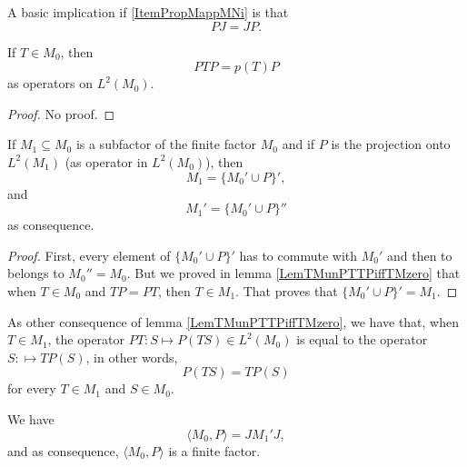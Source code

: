 A basic implication if \ref{ItemPropMappMNi} is that 
\begin{equation}
	PJ=JP.
\end{equation}


\begin{lemma}		\label{LemPTPpTPopLdeux}
If $T\in M_0$, then 
\begin{equation}
	PTP=p(T)P
\end{equation}
as operators on $L^2(M_0)$.
\end{lemma}

\begin{proof}
No proof.
\end{proof}

\begin{lemma}		\label{LemNMpPNcup}
If $M_1\subseteq M_0$ is a subfactor of the finite factor $M_0$ and if $P$ is the projection onto $L^2(M_1)$ (as operator in $L^2(M_0)$), then
\begin{equation}
	M_1=\{ M_0'\cup P \}',
\end{equation}
and
\begin{equation}
	M_1'=\{ M_0'\cup P \}''
\end{equation}
as consequence.
\end{lemma}

\begin{proof}
First, every element of $\{ M_0'\cup P \}'$ has to commute with $M_0'$ and then to belongs to $M_0''=M_0$. But we proved in lemma \ref{LemTMunPTTPiffTMzero} that when $T\in M_0$ and $TP=PT$, then $T\in M_1$. That proves that $\{ M_0'\cup P \}'=M_1$.
\end{proof}

As other consequence of lemma \ref{LemTMunPTTPiffTMzero}, we have that, when $T\in M_1$, the operator $PT\colon S\mapsto P(TS)\in L^2(M_0)$ is equal to the operator $S\colon \mapsto TP(S)$, in other words,
\begin{equation}		\label{EqPTSeqalTPS}
	P(TS)=TP(S)
\end{equation}
for every $T\in M_1$ and $S\in M_0$.

\begin{lemma}		\label{LemMOJNJequal}
We have
\begin{equation}		\label{EqLemMPJNJequal}
	\langle M_0, P\rangle =JM_1'J,
\end{equation}
and as consequence, $\langle M_0, P\rangle $ is a finite factor.
\end{lemma}

